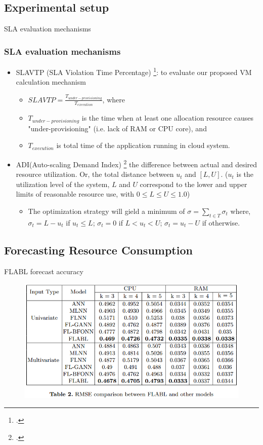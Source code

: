 \documentclass{beamer}
\begin{document}
\subsection*{Experimental setup}
\begin{frame}{SLA evaluation mechanisms}
	\frametitle{SLA evaluation mechanisms}
	\begin{itemize}
		\item {
			SLAVTP (SLA Violation Time Percentage) \footcite{Tran et al. 2017}: to evaluate our proposed VM calculation mechanism
			\begin{itemize}
			\item $ SLAVTP = \frac{T_{under-provisioning}}{T_{execution}}$, where 
			\item $T_{under-provisioning}$ is the time when at least one allocation resource causes "under-provisioning" (i.e. lack of RAM or CPU core), and 
			\item $T_{execution}$ is total time of the application running in cloud system. 
			\end{itemize}
		}
		\item{
			ADI(Auto-scaling Demand Index) \footcite{Netto et al. 2014} the difference between actual and desired resource utilization. \newline
			Or, the total distance between $u_t$ and $[L, U]$. ($u_t$ is the utilization level of the system, $L$ and $U$ correspond to the lower and upper limits of reasonable resource use, with $0 \le L \le U \le 1.0$)
			\begin{itemize}
			\item The optimization strategy will gield a minimum of $\sigma = \sum_{t \in T}{\sigma_t}$ where, $\sigma_t = L - u_t$ if $u_t \le L$; $\sigma_t = 0$ if $L < u_t <U$; $\sigma_t = u_t -U$ if otherwise. 
			\end{itemize}
		}
	\end{itemize}
\end{frame}



\subsection{Forecasting Resource Consumption}
\begin{frame}{FLABL forecast accuracy}
	\begin{figure}
		\includegraphics[width=0.9 \textwidth]{true/forecasting_results.png} %
		\label{fig:forecasting_results}			
	\end{figure}
\end{frame}
\end{document}
